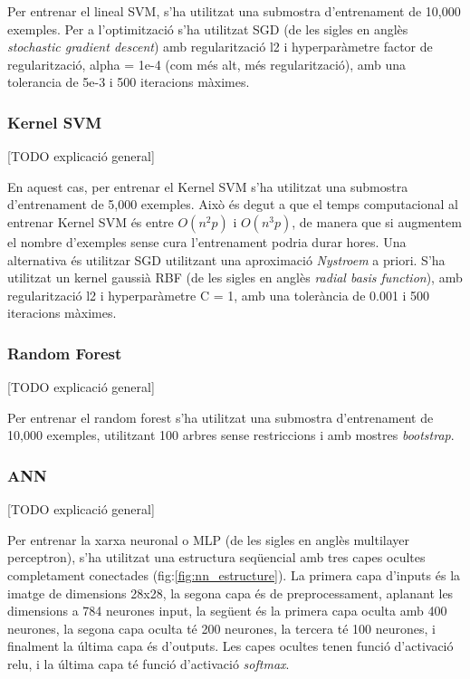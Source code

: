 \documentclass[12pt, spanish]{article}
\begin{document}
Per entrenar el lineal SVM, s'ha utilitzat una submostra d'entrenament de 10,000 exemples. Per a l'optimització s'ha utilitzat SGD (de les sigles en anglès \textit{stochastic gradient descent}) amb regularització l2 i hyperparàmetre factor de regularització, alpha = 1e-4 (com més alt, més regularització), amb una tolerancia de 5e-3 i 500 iteracions màximes.

\subsubsection{Kernel SVM}

[TODO explicació general]

En aquest cas, per entrenar el Kernel SVM s'ha utilitzat una submostra d'entrenament de 5,000 exemples. Això és degut a que el temps computacional al entrenar Kernel SVM és entre $O(n^2 p)$  i $O(n^3 p)$, de manera que si augmentem el nombre d'exemples sense cura l'entrenament podria durar hores. Una alternativa és utilitzar SGD utilitzant una aproximació \textit{Nystroem} a priori. S'ha utilitzat un kernel gaussià RBF (de les sigles en anglès \textit{radial basis function}), amb regularització l2 i hyperparàmetre C = 1, amb una tolerància de 0.001 i 500 iteracions màximes. 

\subsubsection{Random Forest}

[TODO explicació general]

Per entrenar el random forest s'ha utilitzat una submostra d'entrenament de 10,000 exemples, utilitzant 100 arbres sense restriccions i amb mostres \textit{bootstrap}. 

\subsubsection{ANN}

[TODO explicació general]

Per entrenar la xarxa neuronal o MLP (de les sigles en anglès multilayer perceptron), s'ha utilitzat una estructura seqüencial amb tres capes ocultes completament conectades (fig:\ref{fig:nn_estructure}). La primera capa d'inputs és la imatge de dimensions 28x28, la segona capa és de preprocessament, aplanant les dimensions a 784 neurones input, la següent és la primera capa oculta amb 400 neurones, la segona capa oculta té 200 neurones, la tercera té 100 neurones, i finalment la última capa és d'outputs. Les capes ocultes tenen funció d'activació relu, i la última capa té funció d'activació \textit{softmax}. 
\end{document}
